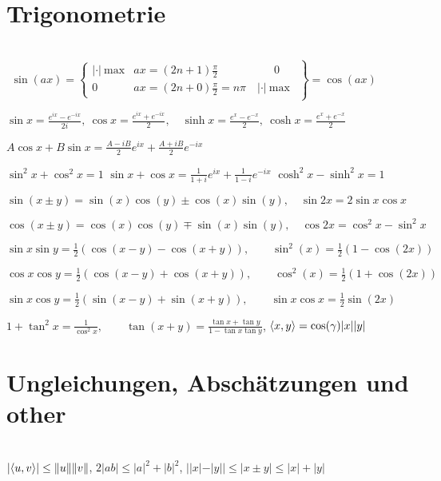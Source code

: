 
\section{Trigonometrie}
\hspace*{\fill} \\
$\left.\begin{aligned}
  \sin(ax)=
  \begin{cases}
    |\cdot|\ \text{max} & ax = (2n+1)\frac{\pi}{2} \quad\quad\quad\quad\quad 0\\
    0 & ax= (2n+0)\frac{\pi}{2}=n\pi  \quad |\cdot|\ \text{max}
  \end{cases}
\end{aligned}\right\rbrace = \cos(ax)$

$\sin x = \frac{e^{ix}-e^{-ix}}{2i},\  \cos x = \frac{e^{ix}+e^{-ix}}{2}, \quad \sinh x = \frac{e^x-e^{-x}}2, \  \cosh x = \frac{e^x+e^{-x}}2$

$A\cos x + B \sin x = \frac{A-iB}2e^{ix} + \frac{A+iB}2e^{-ix}$

$\sin^2x+\cos^2x = 1$ \quad\quad $\sin x+\cos x = \frac{1}{1+i} e^{ix} + \frac{1}{1-i}e^{-ix}$ \quad\quad $\cosh^2x-\sinh^2x=1$

$\sin(x\pm y)=\sin(x)\cos(y)\pm\cos(x)\sin(y), \quad \sin 2x=2\sin x \cos x$

$\cos(x\pm y)=\cos(x)\cos(y)\mp\sin(x)\sin(y), \quad \cos 2x=\cos^2 x - \sin^2 x$

$\sin x \sin y = \frac12(\cos (x-y)-\cos(x+y)),\quad\quad \sin^2(x)=\frac12(1-\cos(2x))$

$\cos x \cos y = \frac12(\cos (x-y)+\cos(x+y)), \quad\quad \cos^2(x)=\frac12(1+\cos(2x))$

$\sin x \cos y = \frac12(\sin (x-y)+\sin(x+y)), \quad\quad \sin x\cos x = \frac12\sin(2x)$

$1+\tan^2x = \frac1{\cos^2x}, \quad\quad \tan(x+y)=\frac{\tan x + \tan y}{1-\tan x \tan y}$, \quad\quad $\langle x,y \rangle=\cos(\gamma)|x||y|$


\section{Ungleichungen, Abschätzungen und other}
\hspace*{\fill} \\
$|\langle u,v \rangle|\leq\lVert u\rVert\lVert v\rVert$, \quad\quad $2|ab| \leq |a|^2+|b|^2$, \quad\quad $||x|-|y||\leq|x\pm y|\leq|x|+|y|$

